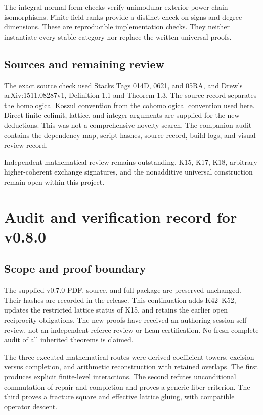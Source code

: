 \documentclass[11pt]{article}
\theoremstyle{definition}
\theoremstyle{remark}
\begin{document}
The integral normal-form checks verify unimodular exterior-power chain isomorphisms. Finite-field ranks provide a distinct check on signs and degree dimensions. These are reproducible implementation checks. They neither instantiate every stable category nor replace the written universal proofs.

\subsection{Sources and remaining review}
The exact source check used Stacks Tags 014D, 0621, and 05RA, and Drew's arXiv:1511.08287v1, Definition 1.1 and Theorem 1.3. The source record separates the homological Koszul convention from the cohomological convention used here. Direct finite-colimit, lattice, and integer arguments are supplied for the new deductions. This was not a comprehensive novelty search. The companion audit contains the dependency map, script hashes, source record, build logs, and visual-review record.

Independent mathematical review remains outstanding. K15, K17, K18, arbitrary higher-coherent exchange signatures, and the nonadditive universal construction remain open within this project.

\clearpage

\clearpage
\section{Audit and verification record for v0.8.0}\label{app:audit-v080}

\subsection{Scope and proof boundary}
The supplied v0.7.0 PDF, source, and full package are preserved unchanged. Their hashes are recorded in the release. This continuation adds K42--K52, updates the restricted lattice status of K15, and retains the earlier open reciprocity obligations. The new proofs have received an authoring-session self-review, not an independent referee review or Lean certification. No fresh complete audit of all inherited theorems is claimed.

The three executed mathematical routes were derived coefficient towers, excision versus completion, and arithmetic reconstruction with retained overlaps. The first produces explicit finite-level interactions. The second refutes unconditional commutation of repair and completion and proves a generic-fiber criterion. The third proves a fracture square and effective lattice gluing, with compatible operator descent.
\end{document}
